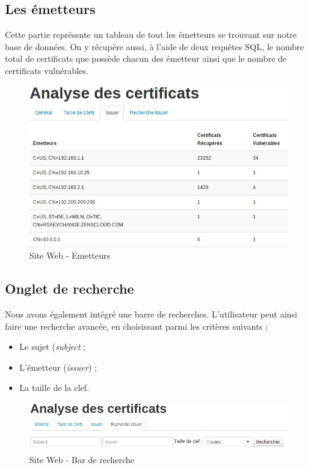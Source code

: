 \subsection{Les émetteurs}

Cette partie représente un tableau de tout les émetteurs se trouvant sur notre base de données. On y récupère aussi, à l'aide de deux requêtes SQL, le nombre total de certificats que possède chacun des émetteur ainsi que le nombre de certificats vulnérables.

\begin{figure}[H]
\begin{center}
\includegraphics[scale=0.5]{images/site_web_issuer.png}
\end{center}
\caption{Site Web - Emetteurs}
\label{issuer}
\end{figure}

\subsection{Onglet de recherche}

Nous avons également intégré une barre de recherches. L'utilisateur peut ainsi faire une recherche avancée, en choisissant parmi les critères suivants :
\begin{itemize}
\item Le sujet (\textit{subject} ;
\item L'émetteur (\textit{issuer}) ;
\item La taille de la clef.\\
\end{itemize}

\begin{figure}[H]
\begin{center}
\includegraphics[scale=0.5]{images/site_web_search_bar.png}
\end{center}
\caption{Site Web - Bar de recherche}
\label{search_bar}
\end{figure}

